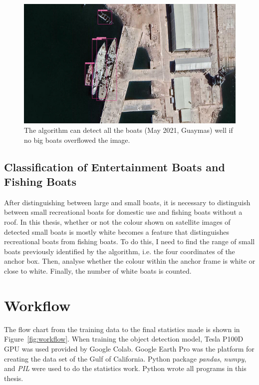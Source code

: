 \begin{figure}
    \centering
    \includegraphics[scale=0.11]{img/Guaymas_202105_detect_small_large.jpg}
    \caption{The algorithm can detect all the boats (May 2021, Guaymas) well if no big boats overflowed the image.}
    \label{fig:Guaymas_202105_detect_small_large}
\end{figure}



\newpage
\subsection{Classification of Entertainment Boats and Fishing Boats}
\label{sec:3.2.5}
After distinguishing between large and small boats, it is necessary to distinguish between small recreational boats for domestic use and fishing boats without a roof. In this thesis, whether or not the colour shown on satellite images of detected small boats is mostly white becomes a feature that distinguishes recreational boats from fishing boats. To do this, I need to find the range of small boats previously identified by the algorithm, i.e. the four coordinates of the anchor box. Then, analyse whether the colour within the anchor frame is white or close to white. Finally, the number of white boats is counted.


\section{Workflow}
The flow chart from the training data to the final statistics made is shown in Figure~\ref{fig:workflow}. When training the object detection model, Tesla P100D GPU was used provided by Google Colab. Google Earth Pro was the platform for creating the data set of the Gulf of California. Python package \textit{pandas}, \textit{numpy}, and \textit{PIL} were used to do the statistics work. Python wrote all programs in this thesis.

